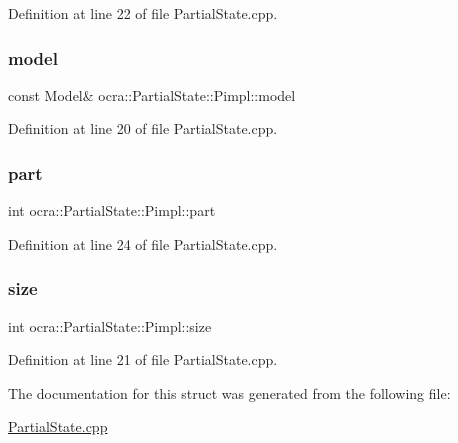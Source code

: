 Definition at line 22 of file Partial\+State.\+cpp.

\hypertarget{structocra_1_1PartialState_1_1Pimpl_a45e5572b9e9cbe6ac2d9ba4107a58bd6}{}\label{structocra_1_1PartialState_1_1Pimpl_a45e5572b9e9cbe6ac2d9ba4107a58bd6} 
\subsubsection{\texorpdfstring{model}{model}}
{\footnotesize\ttfamily const Model\& ocra\+::\+Partial\+State\+::\+Pimpl\+::model}



Definition at line 20 of file Partial\+State.\+cpp.

\hypertarget{structocra_1_1PartialState_1_1Pimpl_a605a55abed1d170fa6911088fefa7337}{}\label{structocra_1_1PartialState_1_1Pimpl_a605a55abed1d170fa6911088fefa7337} 
\subsubsection{\texorpdfstring{part}{part}}
{\footnotesize\ttfamily int ocra\+::\+Partial\+State\+::\+Pimpl\+::part}



Definition at line 24 of file Partial\+State.\+cpp.

\hypertarget{structocra_1_1PartialState_1_1Pimpl_ac60f12a932c9bac309b2c1794de57a9c}{}\label{structocra_1_1PartialState_1_1Pimpl_ac60f12a932c9bac309b2c1794de57a9c} 
\subsubsection{\texorpdfstring{size}{size}}
{\footnotesize\ttfamily int ocra\+::\+Partial\+State\+::\+Pimpl\+::size}



Definition at line 21 of file Partial\+State.\+cpp.



The documentation for this struct was generated from the following file\+:\begin{DoxyCompactItemize}
\item 
\hyperlink{PartialState_8cpp}{Partial\+State.\+cpp}\end{DoxyCompactItemize}
